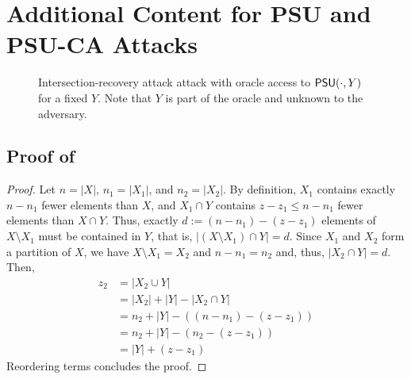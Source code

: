 \section{Additional Content for PSU and PSU-CA Attacks}

\begin{figure}
	\begin{pchstack}
	\end{pchstack}
	\caption{Intersection-recovery attack \PSU attack with oracle access to $\mathsf{PSU}(\cdot, Y)$ for a fixed $Y$. 
	Note that $Y$ is part of the oracle and unknown to the adversary.}
	\label{fig:PSU_attack}
\end{figure}

\subsection{Proof of }\label{ap:PSUCA_comp_m}

\begin{proof}
	Let $n = |X|$, $n_1 = |X_1|$, and $n_2 = |X_2|$. By definition, $X_1$ contains exactly $n - n_1$ fewer elements than $X$, and $X_1 \cap Y$ contains $z - z_1 \leq n - n_1$ fewer elements than $X \cap Y$.
	Thus, exactly $d := (n - n_1) - (z - z_1)$ 
	elements of $X \setminus X_1$ must be contained in $Y$, that is, $|(X\setminus X_1) \cap Y| = d$.
	Since $X_1$ and $X_2$ form a partition of $X$, we have $X\setminus X_1 = X_2$ and $n-n_1 = n_2$
	and, thus, $|X_2 \cap Y| = d$. Then,
	\begin{equation*}
		\begin{split}
			z_2 & = |X_2 \cup Y| \\
			& = |X_2| + |Y| - |X_2 \cap Y| \\
			& = n_2 + |Y| - ((n-n_1) - (z - z_1)) \\
			& = n_2 + |Y| - (n_2 - (z - z_1)) \\
			& = |Y| + (z - z_1)
		\end{split}
	\end{equation*}
	Reordering terms concludes the proof.
\end{proof}


